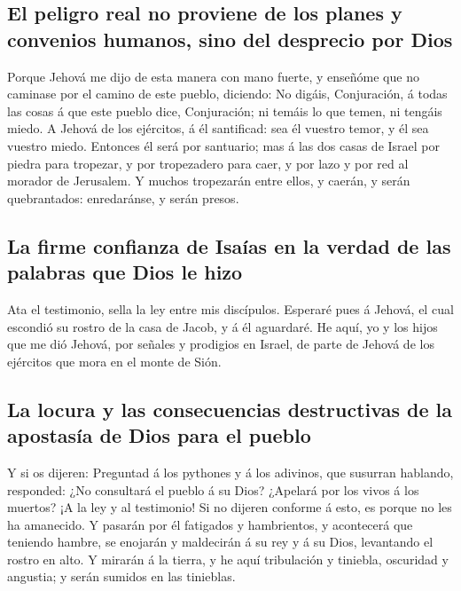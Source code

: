 \hypertarget{el-peligro-real-no-proviene-de-los-planes-y-convenios-humanos-sino-del-desprecio-por-dios}{%
\subsection{El peligro real no proviene de los planes y convenios
humanos, sino del desprecio por
Dios}\label{el-peligro-real-no-proviene-de-los-planes-y-convenios-humanos-sino-del-desprecio-por-dios}}

 Porque Jehová me dijo de esta manera con mano fuerte, y
enseñóme que no caminase por el camino de este pueblo, diciendo:
 No digáis, Conjuración, á todas las cosas á que este
pueblo dice, Conjuración; ni temáis lo que temen, ni tengáis miedo.
 A Jehová de los ejércitos, á él santificad: sea él
vuestro temor, y él sea vuestro miedo.  Entonces él será
por santuario; mas á las dos casas de Israel por piedra para tropezar, y
por tropezadero para caer, y por lazo y por red al morador de Jerusalem.
 Y muchos tropezarán entre ellos, y caerán, y serán
quebrantados: enredaránse, y serán presos.

\hypertarget{la-firme-confianza-de-isauxedas-en-la-verdad-de-las-palabras-que-dios-le-hizo}{%
\subsection{La firme confianza de Isaías en la verdad de las palabras
que Dios le
hizo}\label{la-firme-confianza-de-isauxedas-en-la-verdad-de-las-palabras-que-dios-le-hizo}}

 Ata el testimonio, sella la ley entre mis discípulos.
 Esperaré pues á Jehová, el cual escondió su rostro de la
casa de Jacob, y á él aguardaré.  He aquí, yo y los hijos
que me dió Jehová, por señales y prodigios en Israel, de parte de Jehová
de los ejércitos que mora en el monte de Sión.

\hypertarget{la-locura-y-las-consecuencias-destructivas-de-la-apostasuxeda-de-dios-para-el-pueblo}{%
\subsection{La locura y las consecuencias destructivas de la apostasía
de Dios para el
pueblo}\label{la-locura-y-las-consecuencias-destructivas-de-la-apostasuxeda-de-dios-para-el-pueblo}}

 Y si os dijeren: Preguntad á los pythones y á los
adivinos, que susurran hablando, responded: ¿No consultará el pueblo á
su Dios? ¿Apelará por los vivos á los muertos?  ¡A la ley
y al testimonio! Si no dijeren conforme á esto, es porque no les ha
amanecido.  Y pasarán por él fatigados y hambrientos, y
acontecerá que teniendo hambre, se enojarán y maldecirán á su rey y á su
Dios, levantando el rostro en alto.  Y mirarán á la
tierra, y he aquí tribulación y tiniebla, oscuridad y angustia; y serán
sumidos en las tinieblas.

